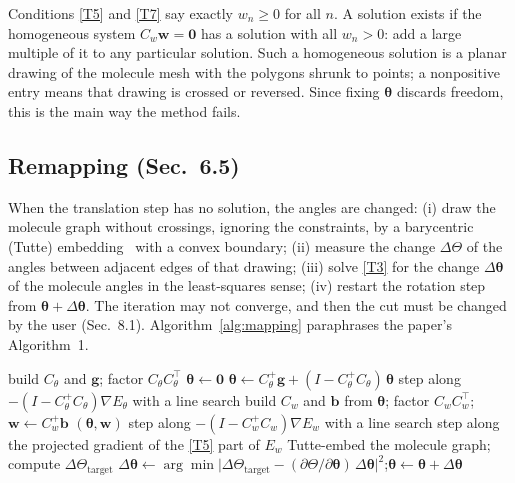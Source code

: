 \documentclass[11pt]{article}
\theoremstyle{definition}
\newcommand{\tv}{\boldsymbol{\theta}}
\newcommand{\wv}{\mathbf{w}}
\begin{document}
Conditions \eqref{T5} and \eqref{T7} say exactly $w_n \ge 0$ for all $n$. A
solution exists if the homogeneous system $C_w \wv = \mathbf 0$ has a solution
with all $w_n > 0$: add a large multiple of it to any particular solution. Such
a homogeneous solution is a planar drawing of the molecule mesh with the polygons
shrunk to points; a nonpositive entry means that drawing is crossed or reversed.
Since fixing $\tv$ discards freedom, this is the main way the method fails.

\subsection{Remapping (Sec.~6.5)}

When the translation step has no solution, the angles are changed: (i) draw the
molecule graph without crossings, ignoring the constraints, by a barycentric
(Tutte) embedding~\cite{tutte63} with a convex boundary; (ii) measure the change
$\Delta\Theta$ of the angles between adjacent edges of that drawing; (iii) solve
\eqref{T3} for the change $\Delta\tv$ of the molecule angles in the
least-squares sense; (iv) restart the rotation step from $\tv + \Delta\tv$. The
iteration may not converge, and then the cut must be changed by the user
(Sec.~8.1). Algorithm~\ref{alg:mapping} paraphrases the paper's Algorithm~1.

\begin{algorithm}[ht]
\caption{Mapping with remapping (our paraphrase of TVCG10 Algorithm~1).}
\label{alg:mapping}
\begin{algorithmic}[1]
\State build $C_\theta$ and $\mathbf g$; factor $C_\theta C_\theta^\top$
\State $\tv \gets \mathbf 0$
\Loop
  \State $\tv \gets C_\theta^+\mathbf g + (I - C_\theta^+C_\theta)\,\tv$
    \State step along $-(I - C_\theta^+C_\theta)\nabla E_\theta$ with a line search
  \EndWhile
  \State build $C_w$ and $\mathbf b$ from $\tv$; factor $C_w C_w^\top$;
    $\wv \gets C_w^+\mathbf b$
  \Repeat
      \State \Return $(\tv, \wv)$
    \EndIf
    \State step along $-(I - C_w^+C_w)\nabla E_w$ with a line search
    \State step along the projected gradient of the \eqref{T5} part of $E_w$
  \EndWhile
  \State Tutte-embed the molecule graph; compute $\Delta\Theta_{\mathrm{target}}$
  \State $\Delta\tv \gets \arg\min \bigl|\Delta\Theta_{\mathrm{target}} -
    (\partial\Theta/\partial\tv)\,\Delta\tv\bigr|^2$;\quad $\tv \gets \tv + \Delta\tv$
\EndLoop
\end{algorithmic}
\end{algorithm}
\end{document}
